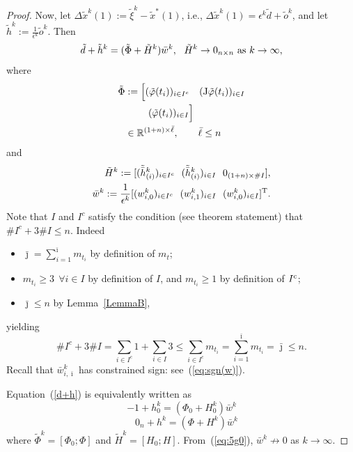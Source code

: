 \documentclass[letterpaper,10pt,conference]{ieeeconf}
\def\R{{\mathbb{R}}}
\begin{document}
\begin{proof}
Now, let $\Delta\tilde x^k(1):= \tilde\xi^k-\tilde x^*(1)$, i.e.,
$\Delta\tilde x^k(1) = \epsilon^k\tilde d+\tilde o^k$,
and let $\tilde h^k:=\frac{1}{\epsilon^k}\tilde o^k$.  Then
\begin{equation}
\label{d+h}
\tilde d + \tilde h^k = (\tilde\Phi+\tilde H^k) \bar w^k,
~~\tilde H^k\to0_{n\times n} {\rm ~as~} k\to\infty,
\end{equation}
where
{\small
\[
\begin{aligned}
\tilde\Phi
&:=\Bigl[(\tilde\varphi(t_i))_{i\in I^c}\quad
({\rm J}\tilde\varphi(t_i))_{i\in I}\\
&\hspace{2.4em}(\tilde\varphi(t_i))_{i\in I}\Bigr]\\
&\in\R^{(1+n)\times\bar\ell},\qquad \bar\ell\leq n
\end{aligned}
\]
and
\[
\begin{aligned}
\tilde H^k:=
[(\tilde{\bar h}_{(i)}^k)_{i\in I^c} ~~ (\tilde{\bar h}_{(i)}^k)_{i\in I}
~~ 0_{(1+n)\times\#I}],\\
\bar w^k:=\frac{1}{\epsilon^k}
[(w_{i,0}^k)_{i\in I^c} ~~ (w_{i,1}^k)_{i\in I} ~~ (w_{i,0}^k)_{i\in I}]^{\rm T}.
\end{aligned}
\]
}
Note that $I$ and $I^c$ satisfy the condition (see theorem statement)
that $\#I^c+3\#I\leq n$.  Indeed
\begin{itemize}
\item $\bar\jmath=\sum_{i=1}^{\bar\imath}m_{t_i}$ by definition of $m_t$;
\item $m_{t_i}\geq3~~\forall i\in I$ by definition of $I$, 
and $m_{t_i}\geq1$ by definition of $I^{\rm c}$;
\item $\bar\jmath\leq n$ by Lemma~\ref{LemmaB},
\end{itemize}
yielding
\[
\# I^c + 3\#I= \sum_{i\in I^c}1 + \sum_{i\in I}3
\leq \sum_{i\in I^c}m_{t_i} = \sum_{i=1}^{\bar\imath}m_{t_i}=\bar\jmath \leq n.
\]
Recall that 
$\bar w^k_{i,\bar\imath}$ has constrained sign: see~(\ref{eq:sgn(w)}).

\noindent
Equation~(\ref{d+h}) is equivalently written as
\begin{equation}
\label{eq:5g0}
-1+h_0^k = (\Phi_0+H_0^k)\bar w^k
\end{equation}
\begin{equation}
\label{eq:5g1}
\quad 0_n+h^k = (\Phi + H^k)\bar w^k
\end{equation}
where $\tilde\Phi^k = [\Phi_0;\Phi]$ and $\tilde H^k=[H_0;H]$.
From~(\ref{eq:5g0}), $\bar w^k\not\to0$ as $k\to\infty$.


\end{proof}
\end{document}
